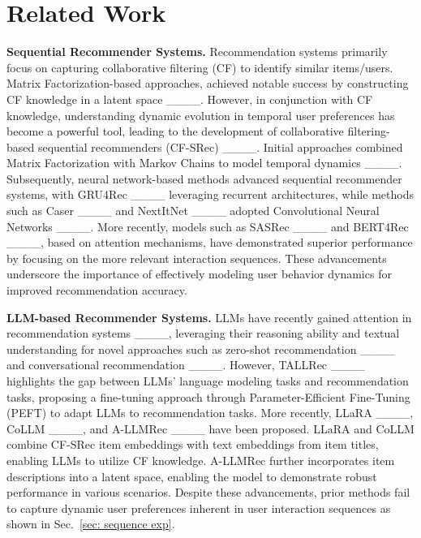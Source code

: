 \section{Related Work}
\noindent\textbf{Sequential Recommender Systems. }
Recommendation systems primarily focus on capturing collaborative filtering (CF) to identify similar items/users. Matrix Factorization-based approaches, achieved notable success by constructing CF knowledge in a latent space ____. However, in conjunction with CF knowledge, understanding dynamic evolution in temporal user preferences has become a powerful tool, leading to the development of collaborative filtering-based sequential recommenders (CF-SRec) ____.
Initial approaches combined Matrix Factorization with Markov Chains to model temporal dynamics ____. Subsequently, neural network-based methods advanced sequential recommender systems, with GRU4Rec ____ leveraging recurrent architectures, while methods such as Caser ____ and NextItNet ____ adopted Convolutional Neural Networks ____. More recently, models such as SASRec ____ and BERT4Rec ____, based on attention mechanisms, have demonstrated superior performance by focusing on the more relevant interaction sequences. These advancements underscore the importance of effectively modeling user behavior dynamics for improved recommendation accuracy.

\smallskip
\noindent\textbf{LLM-based Recommender Systems. }
LLMs have recently gained attention in recommendation systems ____, leveraging their reasoning ability and textual understanding for novel approaches such as zero-shot recommendation ____ and conversational recommendation ____. However, TALLRec ____ highlights the gap between LLMs' language modeling tasks and recommendation tasks, proposing a fine-tuning approach through Parameter-Efficient Fine-Tuning (PEFT) to adapt LLMs to recommendation tasks.
More recently, LLaRA ____, CoLLM ____, and A-LLMRec ____ have been proposed. LLaRA and CoLLM combine CF-SRec item embeddings with text embeddings from item titles, enabling LLMs to utilize CF knowledge. A-LLMRec further incorporates item descriptions into a latent space, enabling the model to demonstrate robust performance in various scenarios.
Despite these advancements, prior methods fail to capture dynamic user preferences inherent in user interaction sequences as shown in Sec.~\ref{sec: sequence exp}. 


